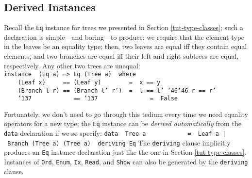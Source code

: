 \subsection{Derived Instances}
\label{tut-derived-instances}

Recall the \mbox{\tt Eq} instance for trees we presented in Section
\ref{tut-type-classes}; such a declaration is
simple---and boring---to produce: we require that the
element type in the leaves be an equality type; then, two leaves are
equal iff they contain equal elements, and two branches are equal iff
their left and right subtrees are equal, respectively.  Any other two
trees are unequal:
\bprog
\mbox{\tt instance\ \ (Eq\ a)\ =>\ Eq\ (Tree\ a)\ \ where}\\
\mbox{\tt \ \ \ \ (Leaf\ x)\ \ \ \ \ ==\ (Leaf\ y)\ \ \ \ \ \ \ \ =\ \ x\ ==\ y}\\
\mbox{\tt \ \ \ \ (Branch\ l\ r)\ ==\ (Branch\ l'\ r')\ \ =\ \ l\ ==\ l'\ {\char'46}{\char'46}\ r\ ==\ r'}\\
\mbox{\tt \ \ \ \ {\char'137}\ \ \ \ \ \ \ \ \ \ \ \ ==\ {\char'137}\ \ \ \ \ \ \ \ \ \ \ \ \ \ \ =\ \ False}
\eprog

Fortunately, we don't need to go through this tedium every time we
need equality operators for a new type; the \mbox{\tt Eq} instance can be {\em
derived automatically} from the \mbox{\tt data} declaration if we so specify:
\bprog
\mbox{\tt data\ \ Tree\ a\ \ \ \ \ \ \ \ \ \ \ \ =\ \ Leaf\ a\ |\ Branch\ (Tree\ a)\ (Tree\ a)\ \ deriving\ Eq}
\eprog
The \mbox{\tt deriving} clause implicitly produces an \mbox{\tt Eq} instance declaration
just like the one in Section \ref{tut-type-classes}.  Instances of \mbox{\tt Ord},
\mbox{\tt Enum}, \mbox{\tt Ix}, \mbox{\tt Read}, and \mbox{\tt Show} can also be generated by the
\mbox{\tt deriving} clause. 

